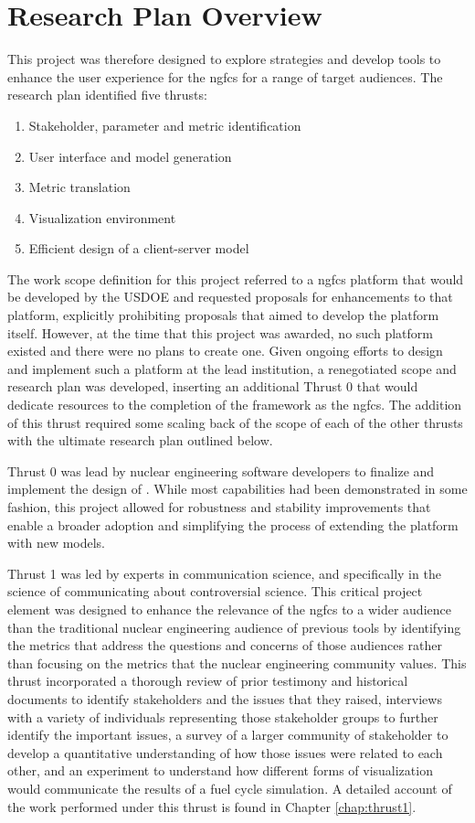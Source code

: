 \section{Research Plan Overview}

This project was therefore designed to explore strategies and develop tools to
enhance the user experience for the \gls{ngfcs} for a range of target
audiences.  The research plan identified five thrusts:
\begin{enumerate}
  \item Stakeholder, parameter and metric identification
  \item User interface and model generation
  \item Metric translation
  \item Visualization environment
  \item Efficient design of a client-server model
\end{enumerate}

The work scope definition for this project referred to a \gls{ngfcs} platform
that would be developed by the \gls{USDOE} and requested proposals for
enhancements to that platform, explicitly prohibiting proposals that aimed to
develop the platform itself.  However, at the time that this project was
awarded, no such platform existed and there were no plans to create one.
Given ongoing efforts to design and implement such a platform at the lead
institution, a renegotiated scope and research plan was developed, inserting
an additional Thrust 0 that would dedicate resources to the completion of the
\Cyclus framework as the \gls{ngfcs}.  The addition of this thrust required
some scaling back of the scope of each of the other thrusts with the ultimate
research plan outlined below.

Thrust 0 was lead by nuclear engineering software developers to finalize and
implement the design of \Cyclus.  While most capabilities had been
demonstrated in some fashion, this project allowed for robustness and
stability improvements that enable a broader adoption and simplifying the
process of extending the platform with new models.

Thrust 1 was led by experts in communication science, and specifically in the
science of communicating about controversial science.  This critical project
element was designed to enhance the relevance of the \gls{ngfcs} to a wider
audience than the traditional nuclear engineering audience of previous tools
by identifying the metrics that address the questions and concerns of those
audiences rather than focusing on the metrics that the nuclear engineering
community values.  This thrust incorporated a thorough review of prior
testimony and historical documents to identify stakeholders and the issues
that they raised, interviews with a variety of individuals representing those
stakeholder groups to further identify the important issues, a survey of a
larger community of stakeholder to develop a quantitative understanding of how
those issues were related to each other, and an experiment to understand how
different forms of visualization would communicate the results of a fuel cycle
simulation.  A detailed account of the work performed under this thrust is
found in Chapter \ref{chap:thrust1}.

